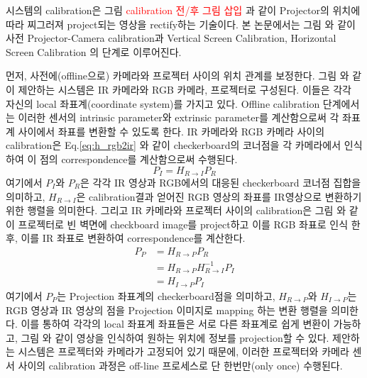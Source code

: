 
시스템의 calibration은 그림 \textcolor{red}{calibration 전/후 그림 삽입} 과 같이 Projector의 위치에 따라 찌그러져 project되는 영상을 rectify하는 기술이다. 본 논문에서는 그림  와 같이 사전 Projector-Camera calibration과 Vertical Screen Calibration, Horizontal Screen Calibration 의 단계로 이루어진다. 

먼저, 사전에(offline으로) 카메라와 프로젝터 사이의 위치 관계를 보정한다. 그림 와 같이 제안하는 시스템은 IR 카메라와 RGB 카메라, 프로젝터로 구성된다. 이들은 각각 자신의 local 좌표계(coordinate system)를 가지고 있다. Offline calibration 단계에서는 이러한 센서의 intrinsic parameter와 extrinsic parameter를 계산함으로써 각 좌표계 사이에서 좌표를 변환할 수 있도록 한다. IR 카메라와 RGB 카메라 사이의 calibration은 Eq.\ref{eq:h_rgb2ir} 와 같이 checkerboard의 코너점을 각 카메라에서 인식하여 이 점의 correspondence를 계산함으로써 수행된다.
\begin{equation}
    P_{I} = H_{R \rightarrow I} P_{R}
    \label{eq:h_rgb2ir}
\end{equation}
여기에서 $P_{I}$와 $P_{R}$은 각각 IR 영상과 RGB에서의 대응된 checkerboard 코너점 집합을 의미하고, $H_{R \rightarrow I}$은 calibration결과 얻어진 RGB 영상의 좌표를 IR영상으로 변환하기 위한 행렬을 의미한다.
그리고 IR 카메라와 프로젝터 사이의 calibration은 그림 와 같이 프로젝터로 빈 벽면에 checkboard image를 project하고 이를 RGB 좌표로 인식 한 후, 이를 IR 좌표로 변환하여 correspondence를 계산한다. 
\begin{equation}
\begin{split}
    P_{P} & = H_{R \rightarrow P} P_{R} \\
          & = H_{R \rightarrow P} H_{R \rightarrow I}^{-1} P_{I} \\
          & = H_{I \rightarrow P} P_{I}
    \label{eq:h_p2r}
\end{split}
\end{equation}
여기에서 $P_{P}$는 Projection 좌표계의 checkerboard점을 의미하고, $H_{R \rightarrow P}$와 $H_{I \rightarrow P}$는 RGB 영상과 IR 영상의 점을 Projection 이미지로 mapping 하는 변환 행렬을 의미한다. 이를 통하여 각각의 local 좌표계 좌표들은 서로 다른 좌표계로 쉽게 변환이 가능하고, 그림 와 같이 영상을 인식하여 원하는 위치에 정보를 projection할 수 있다. 제안하는 시스템은 프로젝터와 카메라가 고정되어 있기 때문에, 이러한 프로젝터와 카메라 센서 사이의 calibration 과정은 off-line 프로세스로 단 한번만(only once) 수행된다. 

